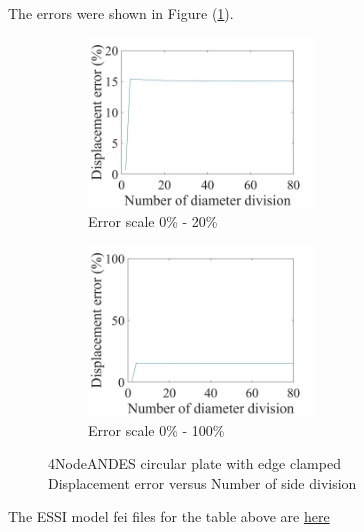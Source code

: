 \documentclass[fleqn,11pt,letter]{article}
\begin{document}
The errors were shown in Figure (\ref{fig 4NodeANDES circular plate with edge clamped}).
\begin{figure}[H]
  \begin{subfigure}{0.5\textwidth}
    \centering
    \includegraphics[width=6cm]{../Figure_files/4NodeANDES/error4andes_circular_plate_clamped.jpeg}
    \caption{Error scale 0\% - 20\%}
  \end{subfigure}
  \begin{subfigure}{0.5\textwidth}
    \centering
    \includegraphics[width=6cm]{../Figure_files/4NodeANDES/error4andes_circular_plate_clamped100.jpeg}
    \caption{Error scale 0\% - 100\%}
  \end{subfigure}
  \captionsetup{justification=centering,margin=3cm}
  \caption{4NodeANDES circular plate with edge clamped\\
      Displacement error   versus   Number of side division}
  \label{fig 4NodeANDES circular plate with edge clamped}
\end{figure}



The ESSI model fei files for the table above are \href{https://github.com/yuan-energy/ESSI_Verification/blob/master/4NodeANDES/circular_plate_clamped/circular_plate_clamped.tar.gz?raw=true}{here}














\end{document}
